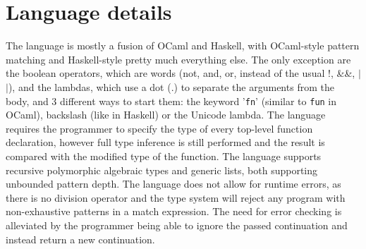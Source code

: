 \documentclass{article}
\begin{document}
	\section{Language details}
	The language is mostly a fusion of OCaml and Haskell, with OCaml-style pattern matching and
	Haskell-style pretty much everything else. The only exception are the boolean operators,
	which are words (not, and, or, instead of the usual !, \&\&, $|$$|$), and the lambdas, which
	use a dot (.) to separate the arguments from the body, and 3 different ways to start them:
	the keyword '\texttt{fn}' (similar to \texttt{fun} in OCaml), backslash (like in Haskell) or the Unicode lambda.
	The language requires the programmer to specify the type of every top-level function declaration, however full type inference is still performed and the result is compared with the modified type of the function.
	The language supports recursive polymorphic algebraic types and generic lists, both supporting 
	unbounded pattern depth. The language does not allow for runtime errors, as there is no division operator and the type system will reject any program with non-exhaustive patterns in a match expression. The need for error checking is alleviated by the programmer being able to ignore the passed continuation and instead return a new continuation.
\end{document}
